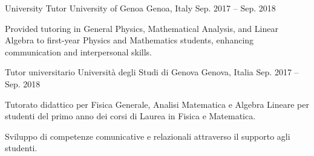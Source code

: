 \begin{cventries}

\ifenglish
\cventry
{University Tutor} %
{University of Genoa} %
{Genoa, Italy} %
{Sep. 2017 -- Sep. 2018} %
{ %
\begin{cvitems}
  \item {Provided tutoring in General Physics, Mathematical Analysis, and Linear Algebra to first-year Physics and Mathematics students, enhancing communication and interpersonal skills.}
\end{cvitems}
}
\else
\cventry
{Tutor universitario} %
{Università degli Studi di Genova} %
{Genova, Italia} %
{Sep. 2017 -- Sep. 2018} %
{ %
\begin{cvitems}
\item {Tutorato didattico per Fisica Generale, Analisi Matematica e Algebra Lineare per studenti del primo anno dei corsi di Laurea in Fisica e Matematica.}
\item {Sviluppo di competenze comunicative e relazionali attraverso il supporto agli studenti.}
\end{cvitems}
}
\fi


\end{cventries}